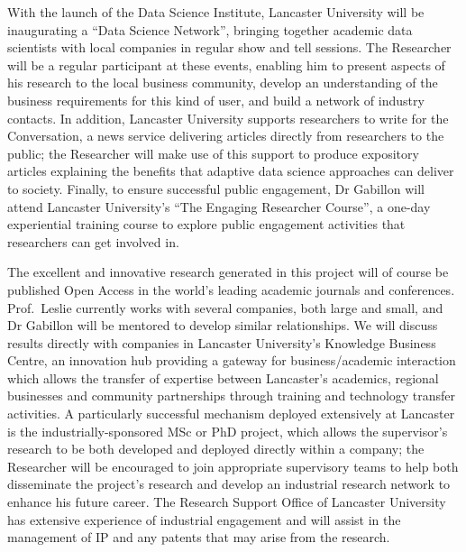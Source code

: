 \documentclass[a4paper,11pt]{article}
\newcommand{\TODO}[1]{{\textcolor{red}{[\textbf{TODO:} #1]}}}
\begin{document}

With the launch of the Data Science Institute, Lancaster University will be inaugurating a ``Data Science Network'', bringing together academic data scientists with local companies in regular show and tell sessions.  The Researcher will be a regular participant at these events, enabling him to present aspects of his research to the local business community, develop an understanding of the business requirements for this kind of user, and build a network of industry contacts.  In addition, Lancaster University supports researchers to write for the Conversation, a news  service delivering articles directly from researchers to the public; the Researcher will make use of this support to produce expository articles explaining the benefits that adaptive data science approaches can deliver to society.  Finally, to ensure successful public engagement, Dr Gabillon will attend Lancaster University's ``The Engaging Researcher Course'', a one-day experiential training course to explore public engagement activities that researchers can get involved in.

The excellent and innovative research generated in this project will of course be published Open Access in the world's leading academic journals and conferences.  Prof.\ Leslie currently works with several companies, both large and small, and Dr Gabillon will be mentored to develop similar relationships.  We will discuss results directly with companies in Lancaster University's Knowledge Business Centre, an innovation hub providing a gateway for business/academic interaction which allows the transfer of expertise between Lancaster's academics, regional businesses and community partnerships through training and technology transfer activities.  A particularly successful mechanism deployed extensively at Lancaster is the industrially-sponsored MSc or PhD project, which allows the supervisor's research to be both developed and deployed directly within a company; the Researcher will be encouraged to join appropriate supervisory teams to help both disseminate the project's research and develop an industrial research network to enhance his future career.  The Research Support Office of Lancaster University has extensive experience of industrial engagement and will assist in the management of IP and any patents that may arise from the research.
\end{document}
